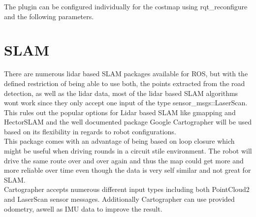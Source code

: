 The plugin can be configured individually for the costmap using rqt\_reconfigure and the following parameters.

\begin{table}[H]
\centering
{}
\label{dynlayerparams}
\caption{dynamic\_cost\_layer parameters}
\end{table}



\section{SLAM}
There are numerous lidar based SLAM packages available for ROS, but with the defined restriction of being able to use both, the points extracted from the road detection, as well as the lidar data, most of the lidar based SLAM algorithms wont work since they only accept one input of  the type sensor\_msgs::LaserScan.\\
This rules out the popular options for Lidar based SLAM like gmapping and HectorSLAM and the well documented package Google Cartographer will be used based on its flexibility in regards to robot configurations.\\
This package comes with an advantage of being based on loop closure which might be useful when driving rounds in a circuit stile environment. The robot will drive the same route over and over again and thus the map could get more and more reliable over time even though the data is very self similar and not great for SLAM.\\

Cartographer accepts numerous different input types including both PointCloud2 and LaserScan sensor messages. Additionally Cartographer can use provided odometry, aswell as IMU data to improve the result.\\








